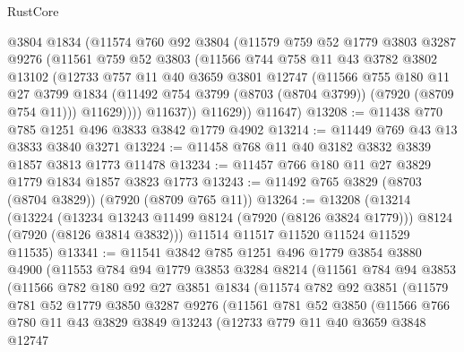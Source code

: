 \begin{lexlean}{RustCore}
\begin{coremodule}
          @3804
          @1834
          (@11574
            @760
            @92
            @3804
            (@11579
              @759
              @52
              @1779
              @3803
              @3287
              @9276
              (@11561
                @759
                @52
                @3803
                (@11566
                  @744
                  @758
                  @11
                  @43
                  @3782
                  @3802
                  @13102
                  (@12733
                    @757
                    @11
                    @40
                    @3659
                    @3801
                    @12747
                    (@11566
                      @755
                      @180
                      @11
                      @27
                      @3799
                      @1834
                      (@11492 @754 @3799 (@8703 (@8704 @3799)) (@7920 (@8709 @754 @11)))
                      @11629))))
              @11637))
          @11629))
      @11647)
@13208 := @11438 @770 @785 @1251 @496 @3833 @3842 @1779 @4902
@13214 := @11449 @769 @43 @13 @3833 @3840 @3271
@13224 := @11458 @768 @11 @40 @3182 @3832 @3839 @1857 @3813 @1773 @11478
@13234 := @11457 @766 @180 @11 @27 @3829 @1779 @1834 @1857 @3823 @1773
@13243 := @11492 @765 @3829 (@8703 (@8704 @3829)) (@7920 (@8709 @765 @11))
@13264 := @13208
    (@13214
      (@13224
        (@13234 @13243 @11499 @8124 (@7920 (@8126 @3824 @1779)))
        @8124
        (@7920 (@8126 @3814 @3832)))
      @11514
      @11517
      @11520
      @11524
      @11529
      @11535)
@13341 := @11541
    @3842
    @785
    @1251
    @496
    @1779
    @3854
    @3880
    @4900
    (@11553
      @784
      @94
      @1779
      @3853
      @3284
      @8214
      (@11561
        @784
        @94
        @3853
        (@11566
          @782
          @180
          @92
          @27
          @3851
          @1834
          (@11574
            @782
            @92
            @3851
            (@11579
              @781
              @52
              @1779
              @3850
              @3287
              @9276
              (@11561
                @781
                @52
                @3850
                (@11566
                  @766
                  @780
                  @11
                  @43
                  @3829
                  @3849
                  @13243
                  (@12733
                    @779
                    @11
                    @40
                    @3659
                    @3848
                    @12747

\end{coremodule}
\end{lexlean}
